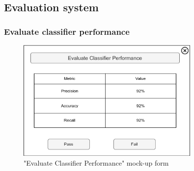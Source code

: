 \subsection{Evaluation system}

\subsubsection{Evaluate classifier performance}

\begin{figure}[H]
\centering
\includegraphics[width=0.8\textwidth]{figures/evaluate_classifier_performance.png}
\caption{"Evaluate Classifier Performance" mock-up form}
\end{figure}

